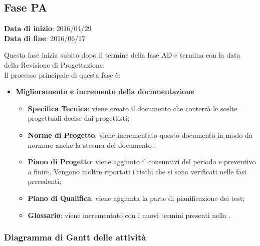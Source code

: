 	\subsection{Fase PA}
	\begin{center}
		\textbf{Data di inizio}: 2016/04/29 \\
		\textbf{Data di fine}: 2016/06/17 \\
	\end{center}
	Questa fase inizia subito dopo il termine della fase AD e termina con la data della Revisione di Progettazione. \\
	Il processo principale di questa fase è:
		\begin{itemize}
			\item \textbf{Miglioramento e incremento della documentazione}
			\att
			\begin{itemize}
				\item \textbf{Specifica Tecnica}: viene creato il documento \STdoc che conterrà le scelte progettuali decise dai progettisti;
				\item \textbf{Norme di Progetto}: viene incrementato questo documento in modo da normare anche la stesura del documento \STdoc.
				\item \textbf{Piano di Progetto}: viene aggiunto il consuntivi del periodo e preventivo a finire. Vengono inoltre riportati i rischi che si sono verificati nelle fasi precedenti;
				\item \textbf{Piano di Qualifica}: viene aggiunta la parte di pianificazione dei test;
				\item \textbf{Glossario}: viene incrementato con i nuovi termini presenti nella \STdoc.
			\end{itemize}
		\end{itemize}
		\subsubsection{Diagramma di Gantt delle attività}
		
